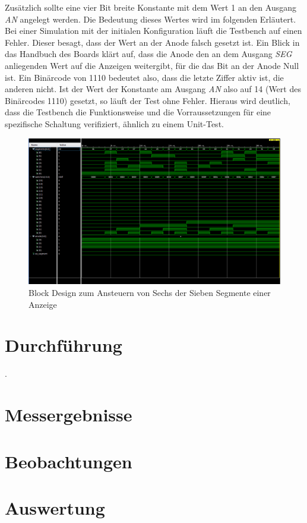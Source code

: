 \documentclass[11pt, a4paper]{article}
\begin{document}
Zusätzlich sollte eine vier Bit breite Konstante mit dem Wert 1 an den Ausgang \textit{AN} angelegt werden. Die Bedeutung dieses Wertes wird im folgenden Erläutert.
Bei einer Simulation mit der initialen Konfiguration läuft die Testbench auf einen Fehler. Dieser besagt, dass der Wert an der Anode falsch gesetzt ist. Ein Blick in das Handbuch des Boards klärt auf, dass die Anode den an dem Ausgang \textit{SEG} anliegenden Wert auf die Anzeigen weitergibt, für die das Bit an der Anode Null ist. Ein Binärcode von 1110 bedeutet also, dass die letzte Ziffer aktiv ist, die anderen nicht.
Ist der Wert der Konstante am Ausgang \textit{AN} also auf 14 (Wert des Binärcodes 1110) gesetzt, so läuft der Test ohne Fehler.
Hieraus wird deutlich, dass die Testbench die Funktionsweise und die Vorraussetzungen für eine spezifische Schaltung verifiziert, ähnlich zu einem Unit-Test.
\begin{figure}[htb]    
    \centering
    \includegraphics[width=\linewidth]{versuch1Data/waveform1.png}
    \caption{Block Design zum Ansteuern von Sechs der Sieben Segmente einer Anzeige}
    \label{aufbauSechsSegment}        
\end{figure}
\section*{Durchführung}. 
\section*{Messergebnisse}
\section*{Beobachtungen}
\section*{Auswertung}
\end{document}
